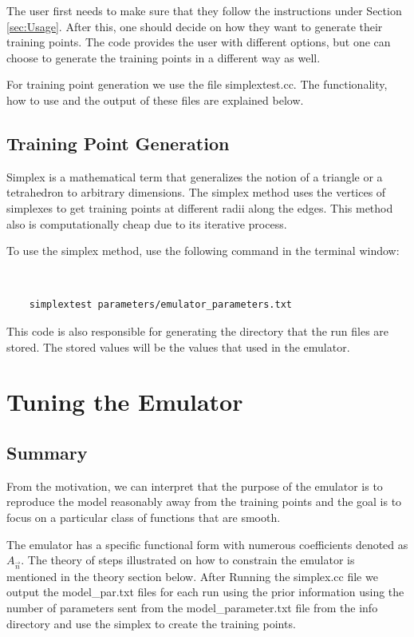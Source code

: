 \documentclass[12pt]{article}
\numberwithin{equation}{section}
\numberwithin{figure}{section}
\begin{document}
The user first needs to make sure that they follow the instructions under Section \ref{sec:Usage}. After this, one should decide on how they want to generate their training points. The code provides the user with different options, but one can choose to generate the training points in a different way as well.

For training point generation we use the file simplextest.cc. The functionality, how to use and the output of these files are explained below.

\subsection{Training Point Generation}

Simplex is a mathematical term that generalizes the notion of a triangle or a tetrahedron to arbitrary dimensions. The simplex method uses the vertices of simplexes to get training points at different radii along the edges. This method also is computationally cheap due to its iterative process.

To use the simplex method, use the following command in the terminal window:

{\tt
{
\begin{verbatim}
    simplextest parameters/emulator_parameters.txt
\end{verbatim}
}}

This code is also responsible for generating the directory that the run files are stored. The stored values will be the values that used in the emulator.

\section{Tuning the Emulator}

\subsection{Summary}

From the motivation, we can interpret that the purpose of the emulator is to reproduce the model reasonably away from the training points and the goal is to focus on a particular class of functions that are smooth. 

The emulator has a specific functional form with numerous coefficients denoted as $A_{\vec{n}}$. The theory of steps illustrated on how to constrain the emulator is mentioned in the theory section below.  After Running the simplex.cc file we output the model\_par.txt files for each run using the prior information using the number of parameters sent from the model\_parameter.txt file from the info directory and use the simplex to create the training points.
\end{document}
